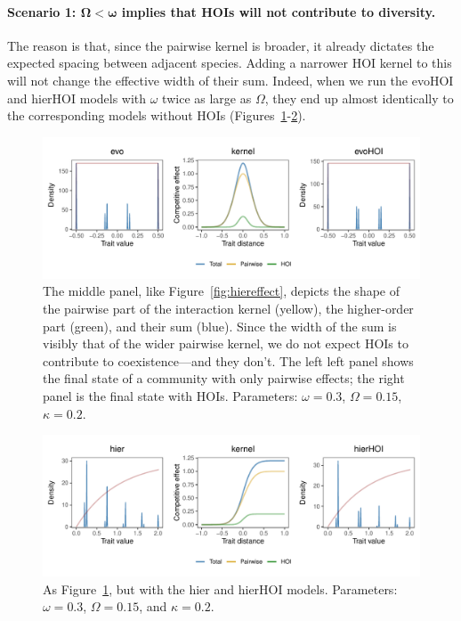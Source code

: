 \documentclass[10pt]{article}
\begin{document}
\clearpage

\paragraph{Scenario 1: $\bm{\Omega < \omega}$ implies that HOIs will not contribute to diversity.}
The reason is that, since the pairwise kernel is broader, it already dictates the expected spacing between adjacent species. Adding a narrower HOI kernel to this will not change the effective width of their sum. Indeed, when we run the evoHOI and hierHOI models with $\omega$ twice as large as $\Omega$, they end up almost identically to the corresponding models without HOIs (Figures~\ref{fig:scen-1-evo}-\ref{fig:scen-1-hier}).

\begin{figure}[!ht]
  \centering
  \includegraphics[width=\textwidth]{scen-1-evo.pdf}
  \caption{The middle panel, like Figure~\ref{fig:hiereffect}, depicts the shape of the pairwise part of the interaction kernel (yellow), the higher-order part (green), and their sum (blue). Since the width of the sum is visibly that of the wider pairwise kernel, we do not expect HOIs to contribute to coexistence---and they don't. The left left panel shows the final state of a community with only pairwise effects; the right panel is the final state with HOIs. Parameters: $\omega = 0.3$, $\Omega = 0.15$, $\kappa = 0.2$.}
  \label{fig:scen-1-evo}
\end{figure}

\begin{figure}[!ht]
  \centering
  \includegraphics[width=\textwidth]{scen-1-hier.pdf}
  \caption{As Figure~\ref{fig:scen-1-evo}, but with the hier and hierHOI models. Parameters: $\omega = 0.3$, $\Omega = 0.15$, and $\kappa = 0.2$.}
  \label{fig:scen-1-hier}
\end{figure}
\end{document}
